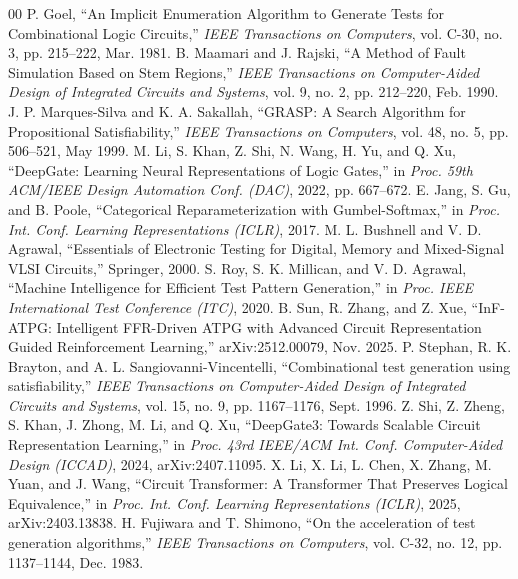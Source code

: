 \documentclass[conference]{IEEEtran}
\begin{document}
\begin{thebibliography}{00}
    P. Goel, ``An Implicit Enumeration Algorithm to Generate Tests for Combinational Logic Circuits,'' \emph{IEEE Transactions on Computers}, vol. C-30, no. 3, pp. 215--222, Mar. 1981.
    B. Maamari and J. Rajski, ``A Method of Fault Simulation Based on Stem Regions,'' \emph{IEEE Transactions on Computer-Aided Design of Integrated Circuits and Systems}, vol. 9, no. 2, pp. 212--220, Feb. 1990.
    J. P. Marques-Silva and K. A. Sakallah, ``GRASP: A Search Algorithm for Propositional Satisfiability,'' \emph{IEEE Transactions on Computers}, vol. 48, no. 5, pp. 506--521, May 1999.
    M. Li, S. Khan, Z. Shi, N. Wang, H. Yu, and Q. Xu, ``DeepGate: Learning Neural Representations of Logic Gates,'' in \emph{Proc. 59th ACM/IEEE Design Automation Conf. (DAC)}, 2022, pp. 667--672.
    E. Jang, S. Gu, and B. Poole, ``Categorical Reparameterization with Gumbel-Softmax,'' in \emph{Proc. Int. Conf. Learning Representations (ICLR)}, 2017.
    M. L. Bushnell and V. D. Agrawal, ``Essentials of Electronic Testing for Digital, Memory and Mixed-Signal VLSI Circuits,'' Springer, 2000.
    S. Roy, S. K. Millican, and V. D. Agrawal, ``Machine Intelligence for Efficient Test Pattern Generation,'' in \emph{Proc. IEEE International Test Conference (ITC)}, 2020.
    B. Sun, R. Zhang, and Z. Xue, ``InF-ATPG: Intelligent FFR-Driven ATPG with Advanced Circuit Representation Guided Reinforcement Learning,'' arXiv:2512.00079, Nov. 2025.
    P. Stephan, R. K. Brayton, and A. L. Sangiovanni-Vincentelli, ``Combinational test generation using satisfiability,'' \emph{IEEE Transactions on Computer-Aided Design of Integrated Circuits and Systems}, vol. 15, no. 9, pp. 1167--1176, Sept. 1996.
    Z. Shi, Z. Zheng, S. Khan, J. Zhong, M. Li, and Q. Xu, ``DeepGate3: Towards Scalable Circuit Representation Learning,'' in \emph{Proc. 43rd IEEE/ACM Int. Conf. Computer-Aided Design (ICCAD)}, 2024, arXiv:2407.11095.
    X. Li, X. Li, L. Chen, X. Zhang, M. Yuan, and J. Wang, ``Circuit Transformer: A Transformer That Preserves Logical Equivalence,'' in \emph{Proc. Int. Conf. Learning Representations (ICLR)}, 2025, arXiv:2403.13838.
    H. Fujiwara and T. Shimono, ``On the acceleration of test generation algorithms,'' \emph{IEEE Transactions on Computers}, vol. C-32, no. 12, pp. 1137--1144, Dec. 1983.

\end{thebibliography}
\end{document}
